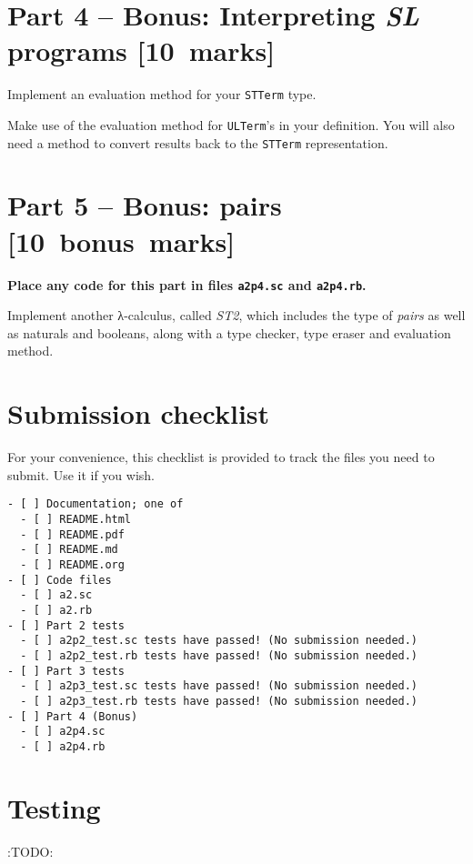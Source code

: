 \documentclass[11pt]{article}
\begin{document}
\section*{Part 4 – Bonus: Interpreting \emph{SL} programs                     [10 marks]}
\label{sec:org63838f4}
Implement an evaluation method for your \texttt{STTerm} type.

Make use of the evaluation method for \texttt{ULTerm}'s in your definition.
You will also need a method to convert results back
to the \texttt{STTerm} representation.

\section*{Part 5 – Bonus: pairs                                        [10 bonus marks]}
\label{sec:org5d33016}
\begin{center}
\textbf{Place any code for this part in files \texttt{a2p4.sc} and \texttt{a2p4.rb}.}
\end{center}

Implement another λ-calculus, called \emph{ST2}, which includes
the type of \emph{pairs} as well as naturals and booleans,
along with a type checker, type eraser and evaluation method.

\section*{Submission checklist}
\label{sec:orgcc60cdb}
For your convenience, this checklist is provided
to track the files you need to submit.
Use it if you wish.
\begin{verbatim}
- [ ] Documentation; one of
  - [ ] README.html
  - [ ] README.pdf
  - [ ] README.md
  - [ ] README.org
- [ ] Code files
  - [ ] a2.sc
  - [ ] a2.rb
- [ ] Part 2 tests
  - [ ] a2p2_test.sc tests have passed! (No submission needed.)
  - [ ] a2p2_test.rb tests have passed! (No submission needed.)
- [ ] Part 3 tests
  - [ ] a2p3_test.sc tests have passed! (No submission needed.)
  - [ ] a2p3_test.rb tests have passed! (No submission needed.)
- [ ] Part 4 (Bonus)
  - [ ] a2p4.sc
  - [ ] a2p4.rb
\end{verbatim}

\section*{Testing}
\label{sec:orge70b896}
:TODO:
\end{document}
